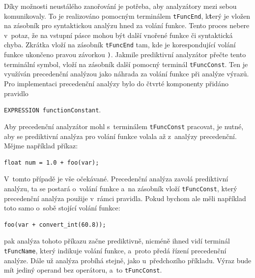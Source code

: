 Díky možnosti neustálého zanořování je potřeba, aby analyzátory mezi sebou komunikovaly.
To je realizováno pomocným terminálem \texttt{t\textunderscore FuncEnd}, k\textbf{t}erý je vložen na zásobník pro syntaktickou analýzu hned za volání funkce.
Tento proces nebere v~potaz, že na vstupní pásce mohou být další vnořené funkce či syntaktická chyba.
Zkrátka vloží na zásobník \texttt{t\textunderscore FuncEnd} tam, kde je korespondující volání funkce ukončeno pravou závorkou \texttt{)}.
Jakmile prediktivní analyzátor přečte tento terminální symbol, vloží na zásobník další pomocný terminál \texttt{t\textunderscore FuncConst}.
Ten je využíván precedenční analýzou jako náhrada za volání funkce při analýze výrazů.
Pro implementaci precedenční analýzy bylo do čtvrté komponenty přidáno pravidlo
\begin{center}
    \texttt{EXPRESSION \textrightarrow{} functionConstant}.
\end{center}

Aby precedenční analyzátor mohl s~terminálem \texttt{t\textunderscore FuncConst} pracovat, je nutné, aby se prediktivní analýza pro volání funkce volala až z~analýzy precedenční.
Mějme například příkaz:
\begin{lstlisting}[language=Koubp]
    float num = 1.0 + foo(var);
\end{lstlisting}
V~tomto případě je vše očekávané.
Precedenční analýza zavolá prediktivní analýzu, ta se postará o~volání funkce a~na zásobník vloží \texttt{t\textunderscore FuncConst}, který precedenční analýza použije v~rámci pravidla.
Pokud bychom ale měli například toto samo o~sobě stojící volání funkce:
\begin{lstlisting}[language=Koubp]
    foo(var + convert_int(60.8));
\end{lstlisting}
pak analýza tohoto příkazu začne prediktivně, nicméně ihned vidí terminál \texttt{t\textunderscore FuncName}, který indikuje volání funkce, a~proto předá řízení precedenční analýze.
Dále už analýza probíhá stejně, jako u~předchozího příkladu. 
Výraz bude mít jediný operand bez operátoru, a~to \texttt{t\textunderscore FuncConst}.


